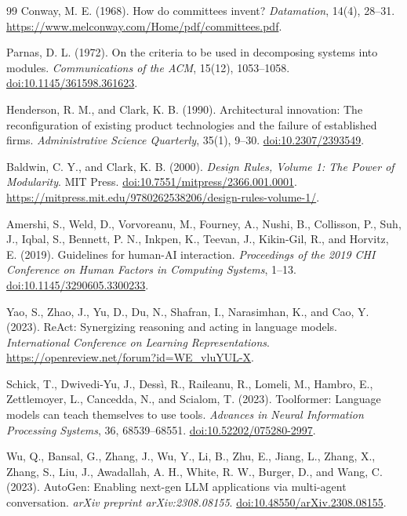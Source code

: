 \documentclass[11pt]{article}
\begin{document}
\begin{thebibliography}{99}
Conway, M. E. (1968).
\newblock How do committees invent?
\newblock \emph{Datamation}, 14(4), 28--31.
\newblock \url{https://www.melconway.com/Home/pdf/committees.pdf}.

Parnas, D. L. (1972).
\newblock On the criteria to be used in decomposing systems into modules.
\newblock \emph{Communications of the ACM}, 15(12), 1053--1058.
\newblock \href{https://doi.org/10.1145/361598.361623}{doi:10.1145/361598.361623}.

Henderson, R. M., and Clark, K. B. (1990).
\newblock Architectural innovation: The reconfiguration of existing product
technologies and the failure of established firms.
\newblock \emph{Administrative Science Quarterly}, 35(1), 9--30.
\newblock \href{https://doi.org/10.2307/2393549}{doi:10.2307/2393549}.

Baldwin, C. Y., and Clark, K. B. (2000).
\newblock \emph{Design Rules, Volume 1: The Power of Modularity}.
\newblock MIT Press.
\newblock \href{https://doi.org/10.7551/mitpress/2366.001.0001}{doi:10.7551/mitpress/2366.001.0001}.
\newblock \url{https://mitpress.mit.edu/9780262538206/design-rules-volume-1/}.

Amershi, S., Weld, D., Vorvoreanu, M., Fourney, A., Nushi, B., Collisson, P.,
Suh, J., Iqbal, S., Bennett, P. N., Inkpen, K., Teevan, J., Kikin-Gil, R., and
Horvitz, E. (2019).
\newblock Guidelines for human-AI interaction.
\newblock \emph{Proceedings of the 2019 CHI Conference on Human Factors in
Computing Systems}, 1--13.
\newblock \href{https://doi.org/10.1145/3290605.3300233}{doi:10.1145/3290605.3300233}.

Yao, S., Zhao, J., Yu, D., Du, N., Shafran, I., Narasimhan, K., and Cao, Y.
(2023).
\newblock ReAct: Synergizing reasoning and acting in language models.
\newblock \emph{International Conference on Learning Representations}.
\newblock \url{https://openreview.net/forum?id=WE_vluYUL-X}.

Schick, T., Dwivedi-Yu, J., Dess{\`i}, R., Raileanu, R., Lomeli, M., Hambro, E.,
Zettlemoyer, L., Cancedda, N., and Scialom, T. (2023).
\newblock Toolformer: Language models can teach themselves to use tools.
\newblock \emph{Advances in Neural Information Processing Systems}, 36,
68539--68551.
\newblock \href{https://doi.org/10.52202/075280-2997}{doi:10.52202/075280-2997}.

Wu, Q., Bansal, G., Zhang, J., Wu, Y., Li, B., Zhu, E., Jiang, L., Zhang, X.,
Zhang, S., Liu, J., Awadallah, A. H., White, R. W., Burger, D., and Wang, C.
(2023).
\newblock AutoGen: Enabling next-gen LLM applications via multi-agent
conversation.
\newblock \emph{arXiv preprint arXiv:2308.08155}.
\newblock \href{https://doi.org/10.48550/arXiv.2308.08155}{doi:10.48550/arXiv.2308.08155}.


\end{thebibliography}
\end{document}
